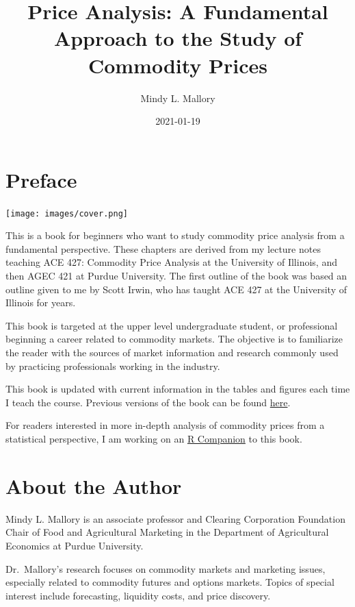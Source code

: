 \documentclass[
]{book}
\title{Price Analysis: A Fundamental Approach to the Study of Commodity Prices}
\author{Mindy L. Mallory}
\date{2021-01-19}
\begin{document}
\maketitle

{
\setcounter{tocdepth}{1}
\tableofcontents
}
\hypertarget{preface}{%
\chapter*{Preface}\label{preface}}

\texttt{[image: images/cover.png]}

This is a book for beginners who want to study commodity price analysis from a fundamental perspective. These chapters are derived from my lecture notes teaching ACE 427: Commodity Price Analysis at the University of Illinois, and then AGEC 421 at Purdue University. The first outline of the book was based an outline given to me by Scott Irwin, who has taught ACE 427 at the University of Illinois for years.

This book is targeted at the upper level undergraduate student, or professional beginning a career related to commodity markets. The objective is to familiarize the reader with the sources of market information and research commonly used by practicing professionals working in the industry.

This book is updated with current information in the tables and figures each time I teach the course. Previous versions of the book can be found \href{https://github.com/mindymallory/PriceAnalysis/releases}{here}.

For readers interested in more in-depth analysis of commodity prices from a statistical perspective, I am working on an \href{http://mindymallory.github.io/R-Companion-Price-Analysis/index.html}{R Companion} to this book.

\hypertarget{about-the-author}{%
\chapter*{About the Author}\label{about-the-author}}

Mindy L. Mallory is an associate professor and Clearing Corporation Foundation Chair of Food and Agricultural Marketing in the Department of Agricultural Economics at Purdue University.

Dr.~Mallory's research focuses on commodity markets and marketing issues, especially related to commodity futures and options markets. Topics of special interest include forecasting, liquidity costs, and price discovery.
\end{document}
